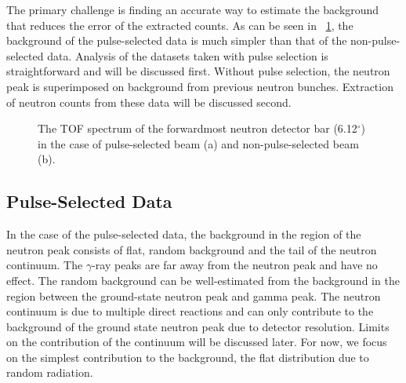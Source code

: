 The primary challenge is finding an accurate way to estimate the background that reduces the error of the extracted counts.  As can be seen in {\fig}~\ref{fig:PSvsNPS}, the background of the pulse-selected data is much simpler than that of the non-pulse-selected data.  Analysis of the datasets taken with pulse selection is straightforward and will be discussed first.  Without pulse selection, the neutron peak is superimposed on background from previous neutron bunches.  Extraction of neutron counts from these data will be discussed second.
\begin{figure}[!htbp]
\centering
{}
\caption{The TOF spectrum of the forwardmost neutron detector bar (6.12$^{\circ}$) in the case of pulse-selected beam (a) and non-pulse-selected beam (b).}
\label{fig:PSvsNPS}
\end{figure}

\subsection{Pulse-Selected Data}
\label{sec:PS_data}
In the case of the pulse-selected data, the background in the region of the neutron peak consists of flat, random background and the tail of the neutron continuum.  The $\gamma$-ray peaks are far away from the neutron peak and have no effect.  The random background can be well-estimated from the background in the region between the ground-state neutron peak and gamma peak.  The neutron continuum is due to multiple direct reactions and can only contribute to the background of the ground state neutron peak due to detector resolution.  Limits on the contribution of the continuum will be discussed later.  For now, we focus on the simplest contribution to the background, the flat distribution due to random radiation.

